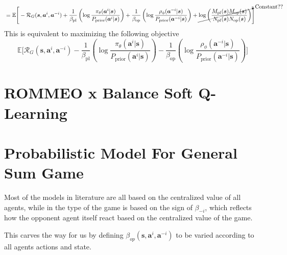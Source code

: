 \begin{equation}
\begin{aligned}
\begin{aligned}[t]
        \end{aligned} \\
        &=\begin{aligned}[t]
            \mathbb{E}\Bigg[ - \mathcal{R}_{G}(\boldsymbol{s}, \boldsymbol{a}^i, \boldsymbol{a}^{-i}) + \frac{1}{\beta_{\text{pl}}}\left(\log \frac{\pi_{\theta}(\boldsymbol{a}^i |\boldsymbol{s})}{P_{\text{prior}}(\boldsymbol{a}^i | \boldsymbol{s})}\right) + \frac{1}{\beta_{\text{op}}} \left(\log \frac{\rho_{\phi}(\boldsymbol{a}^{-i} |\boldsymbol{s})}{P_{\text{prior}}(\boldsymbol{a}^{-i} |\boldsymbol{s})}\right) + \cancelto{\text{Constant??}}{\log\left(\frac{M_{\text{pl}}(\boldsymbol{s})M_{\text{op}}(\boldsymbol{s})}{N_{\text{pl}}(\boldsymbol{s})N_{\text{op}}(\boldsymbol{s})}\right)} \Bigg]
        \end{aligned}
    \end{aligned}
\end{equation}
This is equivalent to maximizing the following objective 
\begin{equation}
    \mathbb{E}\Bigg[ \mathcal{R}_{G}(\boldsymbol{s}, \boldsymbol{a}^i, \boldsymbol{a}^{-i}) - \frac{1}{\beta_{\text{pl}}}\left(\log \frac{\pi_{\theta}(\boldsymbol{a}^i |\boldsymbol{s})}{P_{\text{prior}}(\boldsymbol{a}^i | \boldsymbol{s})}\right) - \frac{1}{\beta_{\text{op}}} \left(\log \frac{\rho_{\phi}(\boldsymbol{a}^{-i} |\boldsymbol{s})}{P_{\text{prior}}(\boldsymbol{a}^{-i} |\boldsymbol{s})}\right)  \Bigg]
\end{equation}


\section{ROMMEO \cite{tian2019regularized} x Balance Soft Q-Learning \cite{grau2018balancing}}

\section{Probabilistic Model For General Sum Game}
Most of the models in literature are all based on the centralized value of all agents, while in \cite{grau2018balancing} the type of the game is based on the sign of $\beta_{-i}$, which reflects how the opponent agent itself react based on the centralized value of the game. 

This carves the way for us by defining $\beta_{op}(\boldsymbol{s}, \boldsymbol{a}^i, \boldsymbol{a}^{-i})$ to be varied according to all agents actions and state. 